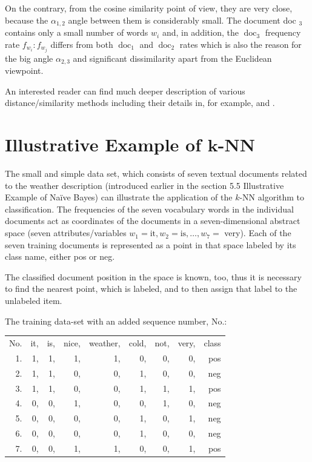 On the contrary, from the cosine similarity point of view, they are very close, because the $\alpha_{1,2}$ angle between them is considerably small. The document doc ${ }_{3}$ contains only a small number of words $w_{i}$ and, in addition, the $\operatorname{doc}_{3}$ frequency rate $f_{w_{i}}: f_{w_{j}}$ differs from both $\operatorname{doc}_{1}$ and $\operatorname{doc}_{2}$ rates which is also the reason for the big angle $\alpha_{2,3}$ and significant dissimilarity apart from the Euclidean viewpoint.

An interested reader can find much deeper description of various distance/similarity methods including their details in, for example, \cite{ref156} and \cite{ref212}.

\section{Illustrative Example of \texorpdfstring{$\boldsymbol{k}$}{k}-NN}
The small and simple data set, which consists of seven textual documents related to the weather description (introduced earlier in the section 5.5 Illustrative Example of Naïve Bayes) can illustrate the application of the $k$-NN algorithm to classification. The frequencies of the seven vocabulary words in the individual documents act as coordinates of the documents in a seven-dimensional abstract space (seven attributes/variables $w_{1}=\mathrm{it}, w_{2}=\mathrm{is}, \ldots, w_{7}=$ very). Each of the seven training documents is represented as a point in that space labeled by its class name, either pos or neg.

The classified document position in the space is known, too, thus it is necessary to find the nearest point, which is labeled, and to then assign that label to the unlabeled item.

The training data-set with an added sequence number, No.:

\begin{flushleft}
\begin{tabular}{rrrrrrrrr}
No. & it, & is, & nice, & weather, & cold, & not, & very, & class \\
1. & 1, & 1, & 1, & 1, & 0, & 0, & 0, & pos\\
2. & 1, & 1, & 0, & 0, & 1, & 0, & 0, & neg\\
3. & 1, & 1, & 0, & 0, & 1, & 1, & 1, & pos\\
4. & 0, & 0, & 1, & 0, & 0, & 1, & 0, & neg\\
5. & 0, & 0, & 0, & 0, & 1, & 0, & 1, & neg\\
6. & 0, & 0, & 0, & 0, & 1, & 0, & 0, & neg\\
7. & 0, & 0, & 1, & 1, & 0, & 0, & 1, & pos\\
\end{tabular}
\end{flushleft}

